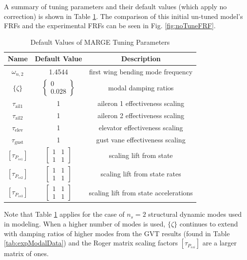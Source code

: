 A summary of tuning parameters and their default values (which apply no correction) is shown in Table \ref{tab:tuningParams}. The comparison of this initial un-tuned model's FRFs and the experimental FRFs can be seen in Fig. \ref{fig:noTuneFRF}.
\begin{table}[h]
	\centering
	\label{tab:tuningParams}
	\caption{Default Values of MARGE Tuning Parameters}
	\begin{tabular}{ccc}
		\hline\hline
		Name & Default Value & Description \\
		\hline
		$\omega_{n,2}$ & 1.4544 & first wing bending mode frequency \\
		$\{\zeta\}$ & $\begin{Bmatrix} 0 \\ 0.028 \end{Bmatrix}$ & modal damping ratios \\
		$\tau_\text{ail1}$ & 1 & aileron 1 effectiveness scaling \\
		$\tau_\text{ail2}$ & 1 & aileron 2 effectiveness scaling \\
		$\tau_\text{elev}$ & 1 & elevator effectiveness scaling \\
		$\tau_\text{gust}$ & 1 & gust vane effectiveness scaling \\
		$\left[\tau_{P_{ss1}}\right]$ & $\begin{bmatrix} 1 & 1 \\ 1 & 1 \end{bmatrix}$ & scaling lift from state \\
		$\left[\tau_{P_{ss2}}\right]$ & $\begin{bmatrix} 1 & 1 \\ 1 & 1 \end{bmatrix}$ & scaling lift from state rates \\
		$\left[\tau_{P_{ss3}}\right]$ & $\begin{bmatrix} 1 & 1 \\ 1 & 1 \end{bmatrix}$ & scaling lift from state accelerations \\
		\hline\hline
	\end{tabular}
\end{table}
Note that Table \ref{tab:tuningParams} applies for the case of $n_s=2$ structural dynamic modes used in modeling. When a higher number of modes is used, $\{\zeta\}$ continues to extend with damping ratios of higher modes from the GVT results (found in Table \ref{tab:expModalData}) and the Roger matrix scaling factors $[\tau_{P_{ssi}}]$ are a larger matrix of ones.

